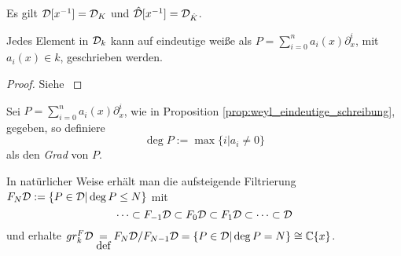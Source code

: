 \begin{bem}
Es gilt $\mathcal{D}[x^{-1}]=\mathcal{D}_K$ und $\hat {\mathcal{D}}[x^{-1}]=\mathcal{D}_{\hat K}$.
\end{bem}

\begin{comment}
\begin{lem} %
Sei $A$ einer der 3 soeben eingeführten Objekten, so definieren die Addition 
\[ +:A\times A \rightarrow A \]
und die Multiplikation
\[ \cdot:A\times A \rightarrow A \]
eine Ringstruktur auf $A$.
\end{lem}
\begin{proof}
\cite[Kapittel 2 Section 1]{ZulaBarbara}
\end{proof}
\end{comment}


\begin{prop} \label{prop:weyl_eindeutige_schreibung}
\cite[Proposition 1.2.3]{sabbah_cimpa90}
Jedes Element in $\mathcal{D}_k$ kann auf eindeutige
weiße als $P=\sum_{i=0}^na_i(x)\partial_x^i$, mit $a_i(x)\in k$, geschrieben
werden.
\end{prop}
\begin{proof}
Siehe \cite[Proposition 1.2.3]{sabbah_cimpa90}
\begin{comment}
ein teil des Beweises ist "left as an exersice"
\end{comment}
\end{proof}

\begin{comment}
Besser?:\\
erst Filtrierung definieren und dadurch dann den Grad?
\end{comment}
\begin{defn}
Sei $P=\sum_{i=0}^na_i(x)\partial_x^i$, wie in Proposition
\ref{prop:weyl_eindeutige_schreibung}, gegeben, so definiere 
\[
\deg P:=\max\{i|a_i\neq 0\}
\]
als den \emph{Grad} von $P$.
\end{defn}
In natürlicher Weise erhält man die aufsteigende Filtrierung
$F_N\mathcal{D}:=\{P\in\mathcal{D}|\deg P\leq N\}$ mit
\[
\cdots\subset F_{-1}\mathcal{D}\subset F_{0}\mathcal{D}\subset
F_{1}\mathcal{D}\subset\cdots\subset\mathcal{D}
\]
und erhalte $gr_k^F\mathcal{D}\underset{\mbox{def}}{=}F_N\mathcal{D}\slash F_{N-1}\mathcal{D}
=\{P\in\mathcal{D}|\deg P=N\}\cong\mathbb{C}\{x\}$.


